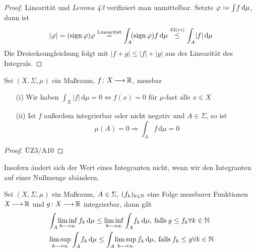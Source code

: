 \documentclass[skript.tex]{subfiles}
\begin{document}
			\begin{proof}
				Linearität und \textit{Lemma 43} verifiziert man unmittelbar. Setzte $\varphi\coloneqq\int \! f \, \mathrm{d}\mu$, dann ist
				\begin{equation*}
					|\varphi|= (\operatorname{sign} \varphi)\varphi \stackrel{\text{Linearität}}= \int_A \! (\operatorname{sign} \varphi)f \, \mathrm{d}\mu \stackrel{43(vi)}{\leq} \int_A \! |f| \, \mathrm{d}\mu
				\end{equation*}
				Die Dreiecksungleichung folgt mit $|f+g|\leq|f|+|g|$ aus der Linearität des Integrals.
			\end{proof}

			\begin{lem}
				Sei $(X,\Sigma,\mu)$ ein Maßraum, $f\colon X\kern -1pt \longrightarrow \kern -1pt\mathbb{R}$, messbar
				\begin{itemize}
					\item[(i)] Wir haben $\int_X \! |f| \, \mathrm{d}\mu=0 \Leftrightarrow f(x)=0$ für $\mu$-fast alle $x\in X$
					\item[(ii)] Ist $f$ außerdem integrierbar oder nicht negativ und $A\in\Sigma$, so ist
						\begin{equation*}
							\mu(A)=0 \Rightarrow \int_A \! f \, \mathrm{d}\mu = 0
						\end{equation*}
				\end{itemize}
			\end{lem}

			\begin{proof}
				ÜZ3/A10
			\end{proof}

			Insofern ändert sich der Wert eines Integranten nicht, wenn wir den Integranten auf einer Nullmenge abändern.

			\begin{lem}
				Sei $(X,\Sigma,\mu)$ ein Maßraum, $A\in\Sigma, \: (f_k)_{k\in\mathbb{N}}$ eine Folge messbarer Funktionen $X\kern -1pt \longrightarrow \kern -1pt\mathbb{R}$ und $g\colon X\kern -1pt \longrightarrow \kern -1pt\mathbb{R}$ integrierbar, dann gilt
				\begin{align*}
				&\int_A \! \liminf\limits_{k\kern -1pt \longrightarrow \kern -1pt\infty} f_k \, \mathrm{d}\mu \leq \liminf\limits_{k\kern -1pt \longrightarrow \kern -1pt\infty}\int_A \! f_k \, \mathrm{d}\mu, \: \mathrm{falls} \: g\leq f_k  \forall k\in\mathbb{N} \\
				&\limsup\limits_{k\kern -1pt \longrightarrow \kern -1pt\infty}\int_A \! f_k \, \mathrm{d}\mu \leq \int_A \! \limsup\limits_{k\kern -1pt \longrightarrow \kern -1pt\infty} f_k \, \mathrm{d}\mu, \: \mathrm{falls} \: f_k\leq g \forall k\in\mathbb{N}
				\end{align*}
			\end{lem}
\end{document}
